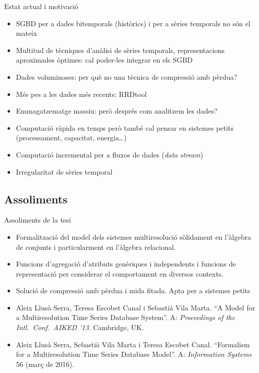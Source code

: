 
\begin{frame}{Estat actual i motivació}
  \begin{itemize}
  \item  SGBD per a dades bitemporals (històrics) i per a sèries temporals no són el mateix
  \item Multitud de tècniques d’anàlisi de sèries temporals, representacions aproximades òptimes: cal poder-les integrar en els SGBD %
  \item Dades voluminoses: per què no una tècnica de compressió amb pèrdua?
  \item Més pes a les dades més recents:  RRDtool%
  \item Emmagatzematge massiu:  però després com analitzem les dades?
  \item Computació ràpida en temps però també cal pensar en sistemes petits (processament, capacitat, energia\dots)
  \item Computació incremental per a fluxos de dades (\emph{data stream})
  \item Irregularitat de sèries temporal
  \end{itemize}

\end{frame}


\subsection{Assoliments}
\begin{frame}{Assoliments de la tesi}

  \begin{itemize}
  \item Formalització del model dels sistemes multiresolució sòlidament en l’àlgebra de conjunts i particularment en l’àlgebra relacional.
  \item Funcions d’agregació d’atributs genèriques i independents i funcions de representació per considerar el comportament en diversos contexts.
  \item Solució de compressió amb pèrdua i mida fitada. Apta per a sistemes petits



\item Aleix Llusà Serra, Teresa Escobet Canal i Sebastià Vila Marta. ``A Model for a Multiresolution Time Series Database System''. A: \emph{Proceedings of the Intl.~Conf.~AIKED ’13}. Cambridge, UK.

\item Aleix Llusà Serra, Sebastià Vila Marta i Teresa Escobet Canal. ``Formalism for a Multiresolution Time Series Database Model''. A: \emph{Information Systems} 56 (març de 2016). 
\end{itemize}


\end{frame}





